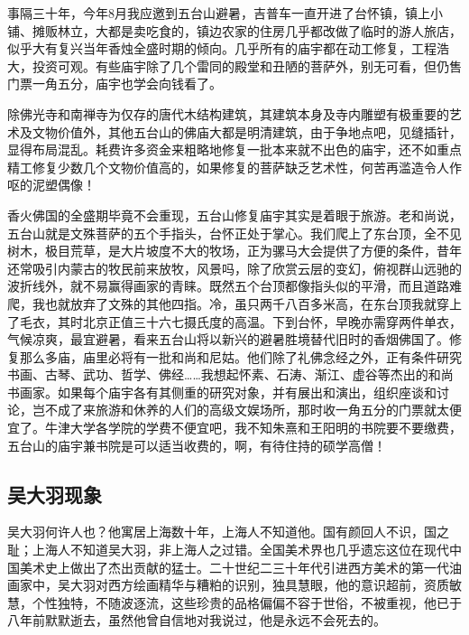 \documentclass{article}
\begin{document}
事隔三十年，今年8月我应邀到五台山避暑，吉普车一直开进了台怀镇，镇上小铺、摊贩林立，大都是卖吃食的，镇边农家的住房几乎都改做了临时的游人旅店，似乎大有复兴当年香烛全盛时期的倾向。几乎所有的庙宇都在动工修复，工程浩大，投资可观。有些庙宇除了几个雷同的殿堂和丑陋的菩萨外，别无可看，但仍售门票一角五分，庙宇也学会向钱看了。

除佛光寺和南禅寺为仅存的唐代木结构建筑，其建筑本身及寺内雕塑有极重要的艺术及文物价值外，其他五台山的佛庙大都是明清建筑，由于争地点吧，见缝插针，显得布局混乱。耗费许多资金来粗略地修复一批本来就不出色的庙宇，还不如重点精工修复少数几个文物价值高的，如果修复的菩萨缺乏艺术性，何苦再滥造令人作呕的泥塑偶像！

香火佛国的全盛期毕竟不会重现，五台山修复庙宇其实是着眼于旅游。老和尚说，五台山就是文殊菩萨的五个手指头，台怀正处于掌心。我们爬上了东台顶，全不见树木，极目荒草，是大片坡度不大的牧场，正为骡马大会提供了方便的条件，昔年还常吸引内蒙古的牧民前来放牧，风景吗，除了欣赏云层的变幻，俯视群山远驰的波折线外，就不易赢得画家的青睐。既然五个台顶都像指头似的平滑，而且道路难爬，我也就放弃了文殊的其他四指。冷，虽只两千八百多米高，在东台顶我就穿上了毛衣，其时北京正值三十六七摄氏度的高温。下到台怀，早晚亦需穿两件单衣，气候凉爽，最宜避暑，看来五台山将以新兴的避暑胜境替代旧时的香烟佛国了。修复那么多庙，庙里必将有一批和尚和尼姑。他们除了礼佛念经之外，正有条件研究书画、古琴、武功、哲学、佛经……我想起怀素、石涛、渐江、虚谷等杰出的和尚书画家。如果每个庙宇各有其侧重的研究对象，并有展出和演出，组织座谈和讨论，岂不成了来旅游和休养的人们的高级文娱场所，那时收一角五分的门票就太便宜了。牛津大学各学院的学费不便宜吧，我不知朱熹和王阳明的书院要不要缴费，五台山的庙宇兼书院是可以适当收费的，啊，有待住持的硕学高僧！
\subsection{吴大羽现象}
吴大羽何许人也？他寓居上海数十年，上海人不知道他。国有颜回人不识，国之耻；上海人不知道吴大羽，非上海人之过错。全国美术界也几乎遗忘这位在现代中国美术史上做出了杰出贡献的猛士。二十世纪二三十年代引进西方美术的第一代油画家中，吴大羽对西方绘画精华与糟粕的识别，独具慧眼，他的意识超前，资质敏慧，个性独特，不随波逐流，这些珍贵的品格偏偏不容于世俗，不被重视，他已于八年前默默逝去，虽然他曾自信地对我说过，他是永远不会死去的。
\end{document}
